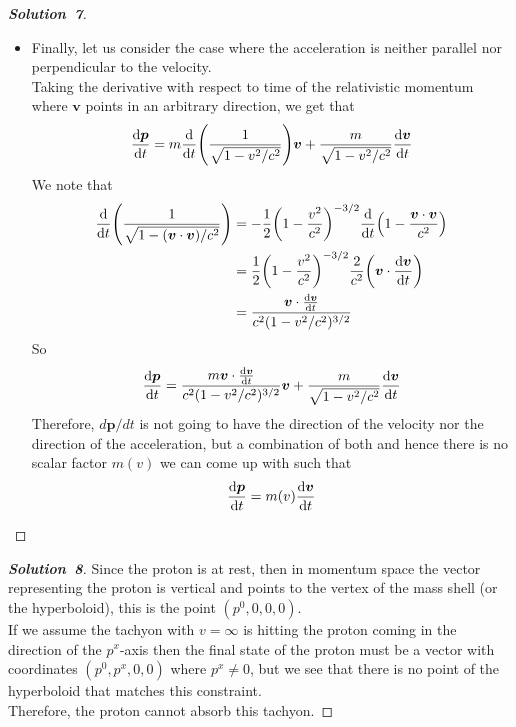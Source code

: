 \documentclass[11pt]{article}
\theoremstyle{definition}
\renewcommand*{\proofname}{\bf{Solution}}
\begin{document}
\begin{proof}[\proofname\ 7]
\begin{itemize}
\begin{align*}
    \dv{\bm{p}}{t} = \frac{m}{\sqrt{1 - v^2/c^2}}\dv{\bm{v}}{t}
\end{align*}
Therefore $m(v)$ must be
\begin{align*}
    m(v) = \frac{m}{\sqrt{1 - v^2/c^2}}
\end{align*}
\item [(c)] Finally, let us consider the case where the acceleration is
neither parallel nor perpendicular to the velocity.\\
Taking the derivative with respect to time of the relativistic momentum where
$\bm{v}$ points in an arbitrary direction, we get that
\begin{align*}
    \dv{\bm{p}}{t}
    = m\dv{t}(\frac{1}{\sqrt{1 - v^2/c^2}})\bm{v}
    + \frac{m}{\sqrt{1 - v^2/c^2}}\dv{\bm{v}}{t}
\end{align*}
We note that
\begin{align*}
    \dv{t}(\frac{1}{\sqrt{1 - (\bm{v}\cdot\bm{v})/c^2}})
    &= -\frac{1}{2}\bigg(1 - \frac{v^2}{c^2}\bigg)^{-3/2}
    \dv{t}(1 - \frac{\bm{v}\cdot\bm{v}}{c^2}) \\
    &= \frac{1}{2}\bigg(1 - \frac{v^2}{c^2}\bigg)^{-3/2}
    \frac{2}{c^2}\bigg(\bm{v}\cdot\dv{\bm{v}}{t}\bigg) \\
    &= \frac{\bm{v}\cdot\dv{\bm{v}}{t}}{c^2(1 - v^2/c^2)^{3/2}}
\end{align*}
So
\begin{align*}
    \dv{\bm{p}}{t}
    = \frac{m\bm{v}\cdot\dv{\bm{v}}{t}}{c^2(1 - v^2/c^2)^{3/2}}\bm{v}
    + \frac{m}{\sqrt{1 - v^2/c^2}}\dv{\bm{v}}{t}
\end{align*}
Therefore, $d\bm{p}/dt$ is not going to have the direction of the
velocity nor the direction of the acceleration, but a combination of both and
hence there is no scalar factor $m(v)$ we can come up with such that
$$\dv{\bm{p}}{t} = m(v)\dv{\bm{v}}{t}$$
\end{itemize}
\end{proof}

\cleardoublepage
\begin{proof}[\proofname\ 8]
Since the proton is at rest, then in momentum space the vector representing the
proton is vertical and points to the vertex of the mass shell
(or the hyperboloid), this is the point $(p^0, 0, 0, 0)$.\\
If we assume the tachyon with $v = \infty$ is hitting the proton coming in
the direction of the $p^x$-axis then the final state of the proton must be
a vector with coordinates $(p^0, p^x, 0, 0)$ where $p^x \neq 0$, but we see
that there is no point of the hyperboloid that matches this constraint.\\
Therefore, the proton cannot absorb this tachyon.
\end{proof}
\end{document}
